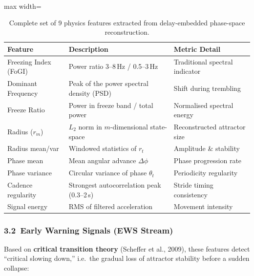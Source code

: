 \documentclass[12pt,a4paper]{article}
\begin{document}
\begin{table}[ht]
\centering
\renewcommand{\arraystretch}{1.2}
\begin{adjustbox}{max width=\textwidth}
\begin{tabular}{p{3.2cm} p{5.5cm} p{5.5cm}}
\toprule
\textbf{Feature} & \textbf{Description} & \textbf{Metric Detail} \\
\midrule
Freezing Index (FoGI) & Power ratio 3--8\,Hz / 0.5--3\,Hz & Traditional spectral indicator \\
Dominant Frequency & Peak of the power spectral density (PSD) & Shift during trembling \\
Freeze Ratio & Power in freeze band / total power & Normalised spectral energy \\
Radius ($r_m$) & $L_2$ norm in $m$-dimensional state-space & Reconstructed attractor size \\
Radius mean/var & Windowed statistics of $r_t$ & Amplitude \& stability \\
Phase mean & Mean angular advance $\Delta\phi$ & Phase progression rate \\
Phase variance & Circular variance of phase $\theta_t$ & Periodicity regularity \\
Cadence regularity & Strongest autocorrelation peak (0.3--2\,s) & Stride timing consistency \\
Signal energy & RMS of filtered acceleration & Movement intensity \\
\bottomrule
\end{tabular}
\end{adjustbox}
\caption{Complete set of 9 physics features extracted from delay-embedded phase-space reconstruction.}
\label{tab:physics_features}
\end{table}

\subsubsection*{3.2\ Early Warning Signals (EWS Stream)}

Based on \textbf{critical transition theory} (Scheffer et al., 2009), these features detect
``critical slowing down,'' i.e.\ the gradual loss of attractor stability before a sudden collapse:
\end{document}

